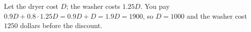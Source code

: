 Let the dryer cost $D$; the washer costs $1.25D$. You pay $0.9D+0.8\cdot1.25D=0.9D+D=1.9D=1900$, so $D=1000$ and the washer cost $\boxed{1250}$ dollars before the discount.
